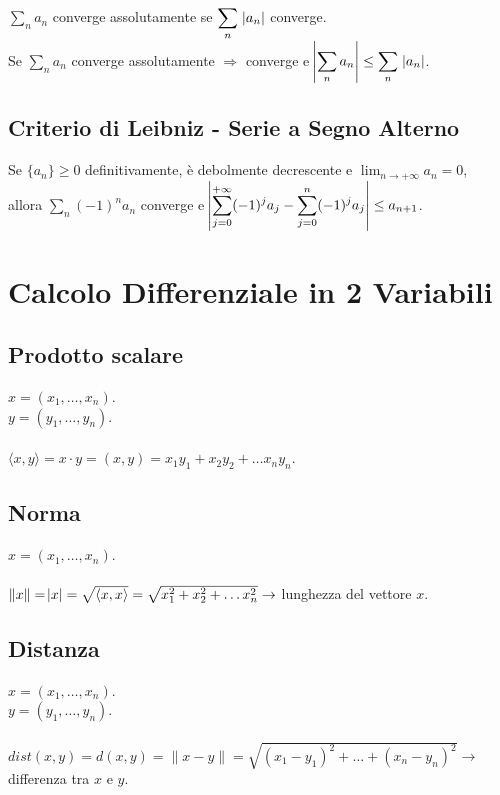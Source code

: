 \documentclass{article}
\begin{document}
$\displaystyle \sum_n a_n$ converge assolutamente se $\displaystyle \sum_n \; \abs{a_n}$ converge. \\
Se $\displaystyle \sum_n a_n$ converge assolutamente $\Rightarrow$ converge e $\displaystyle \abs{\sum_n a_n} \leq \sum_n \; \abs{a_n}$.

\subsection{Criterio di Leibniz - Serie a Segno Alterno}

Se $\{a_n\} \geq 0$ definitivamente, è debolmente decrescente e $\displaystyle \lim_{n \to + \infty} a_n = 0$, \\
allora $\displaystyle \sum_n (-1)^n a_n$ converge e $\displaystyle \abs{\sum_{j=0}^{+ \infty} (-1)^j a_j - \sum_{j=0}^{n} (-1)^j a_j} \leq a_{n+1}$.

\section{Calcolo Differenziale in 2 Variabili}

\subsection{Prodotto scalare}

$x = (x_1, \dots, x_n)$. \\
$y = (y_1, \dots, y_n)$. \\ \\
$\langle x, y \rangle = x \cdot y = (x, y) = x_1y_1 + x_2y_2 + \dots x_ny_n$.

\subsection{Norma}

$x = (x_1, \dots, x_n)$. \\ \\
$\lVert x \rVert = \abs{x} = \sqrt{\langle x, x \rangle} = \sqrt{x_1^2 + x_2^2 + \dots x_n^2} \rightarrow$ lunghezza del vettore $x$. 

\subsection{Distanza}

$x = (x_1, \dots, x_n)$. \\
$y = (y_1, \dots, y_n)$. \\ \\
$dist(x, y) = d(x, y) = \lVert x - y \rVert = \sqrt{(x_1 - y_1)^2 + \dots + (x_n - y_n)^2} \rightarrow$ differenza tra $x$ e $y$.
\end{document}
